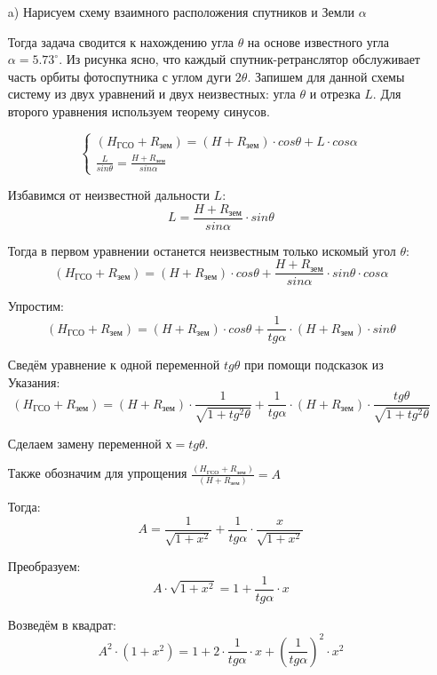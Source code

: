 \begin{enumerate}
    \item[a)] Нарисуем схему взаимного расположения спутников и Земли $\alpha$
 

    Тогда задача сводится к нахождению угла $\theta$ на основе известного угла $\alpha=5.73^\circ$. 
    Из рисунка ясно, что каждый спутник-ретранслятор обслуживает часть орбиты фотоспутника с углом дуги $2\theta$.  
    Запишем для данной схемы систему из двух уравнений и двух неизвестных:
    угла $\theta$ и отрезка $L$. Для второго уравнения используем теорему синусов.
    
    $$\left\{
        \begin{array}{l}
        (H_\text{ГСО}+R_\text{зем})=(H+R_\text{зем})\cdot cos\theta +L\cdot cos\alpha\\
        \frac{L}{sin\theta}=\frac{H+R_\text{зем}}{sin\alpha}
        \end{array} \right.        
    $$
    
    Избавимся от неизвестной дальности $L$:
    $$L=\frac{H+R_\text{зем}}{sin\alpha} \cdot sin\theta$$

    Тогда в первом уравнении останется неизвестным только искомый угол $\theta$:
    $$(H_\text{ГСО}+R_\text{зем} )=(H+R_\text{зем} )\cdot cos\theta +\frac{H+R_\text{зем}}{sin\alpha} \cdot sin\theta \cdot  cos\alpha$$
    
    Упростим:
    $$(H_\text{ГСО}+R_\text{зем} )=(H+R_\text{зем} )\cdot cos\theta + \frac{1}{tg\alpha} \cdot (H+R_\text{зем} )\cdot sin\theta$$ 
    
    Сведём уравнение к одной переменной $tg\theta$ при помощи подсказок из Указания:
    $$(H_\text{ГСО}+R_\text{зем} )=(H+R_\text{зем} )\cdot  \frac{1}{\sqrt{1+tg^2 \theta}}+\frac{1}{tg\alpha} \cdot (H+R_\text{зем} )\cdot  \frac{tg \theta}{\sqrt{1+tg^2 \theta}}$$  
    
    Сделаем замену переменной  $х= tg\theta$. 

    Также обозначим для упрощения $\frac{(H_\text{ГСО}+R_\text{зем} )}{(H+R_\text{зем} )}=A$

    Тогда:
    $$A=\frac{1}{\sqrt{1+x^2}}+\frac{1}{tg\alpha} \cdot  \frac{x}{\sqrt{1+x^2}}$$

    Преобразуем:
    $$A\cdot \sqrt{1+x^2}=1+\frac{1}{tg\alpha} \cdot x$$

    Возведём в квадрат:
    $$A^2 \cdot (1+x^2 )=1+2\cdot  \frac{1}{tg\alpha} \cdot x+\left(\frac{1}{tg\alpha}\right)^2 \cdot x^2$$


\end{enumerate}
